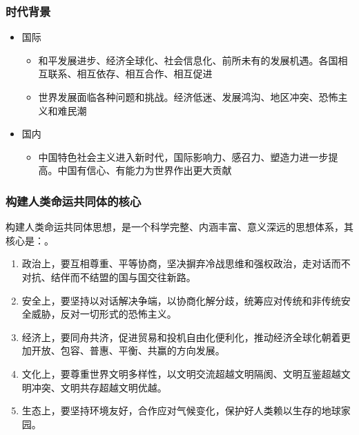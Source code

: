         \subsubsection{时代背景}
        \begin{itemize}
            \item 国际
            \begin{itemize}
                \item 和平发展进步、经济全球化、社会信息化、前所未有的发展机遇。各国相互联系、相互依存、相互合作、相互促进
                \item 世界发展面临各种问题和挑战。经济低迷、发展鸿沟、地区冲突、恐怖主义和难民潮
            \end{itemize}
            \item 国内
            \begin{itemize}
                \item 中国特色社会主义进入新时代，国际影响力、感召力、塑造力进一步提高。中国有信心、有能力为世界作出更大贡献
            \end{itemize}
        \end{itemize}

        \subsubsection{构建人类命运共同体的核心}
        构建人类命运共同体思想，是一个科学完整、内涵丰富、意义深远的思想体系，其核心是：。
        \begin{enumerate}
            \item 政治上，要互相尊重、平等协商，坚决摒弃冷战思维和强权政治，走对话而不对抗、结伴而不结盟的国与国交往新路。
            \item 安全上，要坚持以对话解决争端，以协商化解分歧，统筹应对传统和非传统安全威胁，反对一切形式的恐怖主义。
            \item 经济上，要同舟共济，促进贸易和投机自由化便利化，推动经济全球化朝着更加开放、包容、普惠、平衡、共赢的方向发展。
            \item 文化上，要尊重世界文明多样性，以文明交流超越文明隔阂、文明互鉴超越文明冲突、文明共存超越文明优越。
            \item 生态上，要坚持环境友好，合作应对气候变化，保护好人类赖以生存的地球家园。
        \end{enumerate}

